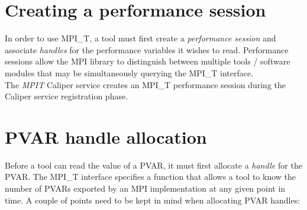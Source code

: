 \section{Creating a performance session}
In order to use MPI\_T, a tool must first create a \emph{performance session} and associate \emph{handles} for the performance variables it wishes to read. Performance sessions allow the MPI library to distinguish between multiple tools / software modules that may be simultaneously querying the MPI\_T interface. \\
The \emph{MPIT} Caliper service creates an MPI\_T performance session during the Caliper service registration phase.
\section{PVAR handle allocation}
Before a tool can read the value of a PVAR, it must first allocate a \emph{handle} for the PVAR. The MPI\_T interface specifies a function that allows a tool to know the number of PVARs exported by an MPI implementation at any given point in time. A couple of points need to be kept in mind when allocating PVAR handles:
